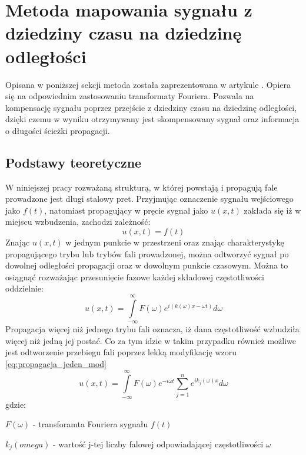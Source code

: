 \section{Metoda mapowania sygnału z dziedziny czasu na dziedzinę odległości}
\label{sec:Wilcox}

Opisana w poniższej sekcji metoda została zaprezentowana w artykule \cite{kasia1}. Opiera się na odpowiednim zastosowaniu transformaty Fouriera. Pozwala na kompensację sygnału poprzez przejście z dziedziny czasu na dziedzinę odległości, dzięki czemu w wyniku otrzymywany jest skompensowany sygnał oraz informacja o długości ścieżki propagacji.

\subsection{Podstawy teoretyczne}

W niniejszej pracy rozważaną strukturą, w której powstają i propagują fale prowadzone jest długi stalowy pret. Przyjmując oznaczenie sygnału wejściowego jako $f(t)$, natomiast propagujący w pręcie sygnał jako $u(x,t)$ zakłada się iż w miejscu wzbudzenia, zachodzi zależność: 
\begin{equation}
u(x,t) = f(t)
\end{equation}
Znając $u(x,t)$ w jednym punkcie w przestrzeni oraz znając charakterystykę propagującego trybu lub trybów fali prowadzonej, można odtworzyć sygnał po dowolnej odległości propagacji oraz w dowolnym punkcie czasowym. Można to osiągnąć rozważając przesunięcie fazowe każdej składowej częstotliwości oddzielnie:
\begin{equation}
u(x,t) = \int\limits_{-\infty}^{\infty}F(\omega)e^{i(k(\omega)x - \omega t)}d\omega \label{eq:propagacja_jeden_mod}
\end{equation}
Propagacja więcej niż jednego trybu fali oznacza, iż dana częstotliwość wzbudziła więcej niż jedną jej postać. Co za tym idzie w takim przypadku również możliwe jest odtworzenie przebiegu fali poprzez lekką modyfikację wzoru \ref{eq:propagacja_jeden_mod}
\begin{equation}
u(x,t) = \int\limits_{-\infty}^{\infty}F(\omega)e^{ -i \omega t}\sum \limits _{j=1}^{n}e^{ik_j(\omega)x} d\omega\label{eq:propagacja_kilka_mod}
\end{equation}
gdzie:

$F(\omega)$ - transforamta Fouriera sygnału $f(t)$

$k_j(omega)$ - wartość j-tej liczby falowej odpowiadającej częstotliwości $\omega$

